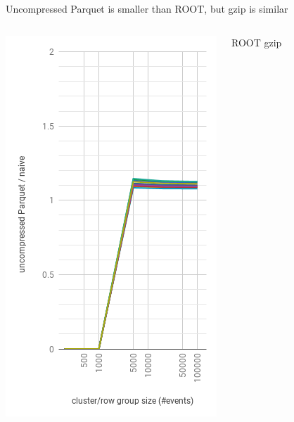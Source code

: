 \documentclass[aspectratio=169]{beamer}
\begin{document}
\begin{frame}{Uncompressed Parquet is smaller than ROOT, but gzip is similar}
\begin{columns}
\begin{center}
\includegraphics[width=\linewidth]{parquet-none.png}
\end{center}
\begin{center}
ROOT gzip


\end{center}
\end{columns}
\end{frame}
\end{document}
